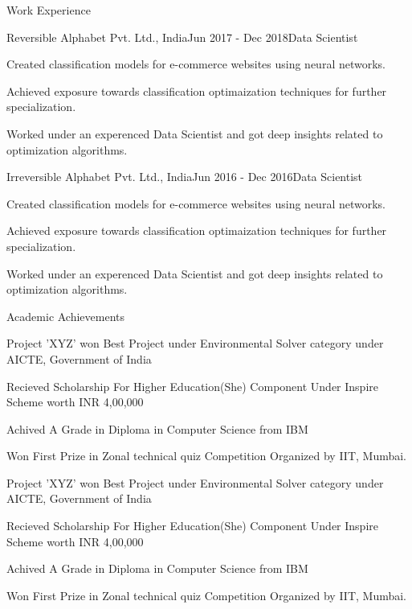 \documentclass{resume}
\begin{document}
    \begin{rSection}{Work Experience}
        \begin{rSubsection}{Reversible Alphabet Pvt. Ltd., India}{Jun 2017 - Dec 2018}{Data Scientist}{}
            \item Created classification models for e-commerce websites using neural networks.
            \item Achieved exposure towards classification optimaization techniques for further specialization.
            \item Worked under an experenced Data Scientist and got deep insights related to optimization algorithms.
        \end{rSubsection}
        \begin{rSubsection}{Irreversible Alphabet Pvt. Ltd., India}{Jun 2016 - Dec 2016}{Data Scientist}{}
            \item Created classification models for e-commerce websites using neural networks.
            \item Achieved exposure towards classification optimaization techniques for further specialization.
            \item Worked under an experenced Data Scientist and got deep insights related to optimization algorithms.
        \end{rSubsection}

    \end{rSection}
% 
    \newpage
    \begin{rSection}{Academic Achievements}
        \item Project 'XYZ' won Best Project under Environmental Solver category under AICTE, Government of India
        \item Recieved Scholarship For Higher Education(She) Component Under Inspire Scheme worth INR 4,00,000
        \item Achived A Grade in Diploma in Computer Science from IBM
        \item Won First Prize in Zonal technical quiz Competition Organized by IIT, Mumbai.
        \item Project 'XYZ' won Best Project under Environmental Solver category under AICTE, Government of India
        \item Recieved Scholarship For Higher Education(She) Component Under Inspire Scheme worth INR 4,00,000
        \item Achived A Grade in Diploma in Computer Science from IBM
        \item Won First Prize in Zonal technical quiz Competition Organized by IIT, Mumbai.
    \end{rSection}
\end{document}
